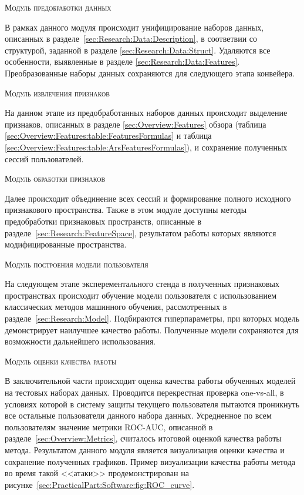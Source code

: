 \documentclass[12pt]{article}
\begin{document}
    \par \textsc{Модуль предобработки данных}
    \par В рамках данного модуля происходит унифицирование наборов данных, описанных в разделе~\ref{sec:Research:Data:Description}, в соответвии со структурой, заданной в разделе \ref{sec:Research:Data:Struct}. Удаляются все особенности, выявленные в разделе \ref{sec:Research:Data:Features}. Преобразованные наборы данных сохраняются для следующего этапа конвейера. \\

    \par \textsc{Модуль извлечения признаков}
    \par На данном этапе из предобработанных наборов данных происходит выделение признаков, описанных в разделе \ref{sec:Overview:Features} обзора (таблица \ref{sec:Overview:Features:table:FeaturesFormulas} и таблица \ref{sec:Overview:Features:table:ArsFeaturesFormulas}), и сохранение полученных сессий пользователей. \\

    \par \textsc{Модуль обработки признаков}
    \par Далее происходит объединение всех сессий и формирование полного исходного признакового пространства. Также в этом модуле доступны методы предобработки признаковых пространств, описанные в разделе~\ref{sec:Research:FeatureSpace}, результатом работы которых являются модифицированные пространства. \\

    \par \textsc{Модуль построения модели пользователя}
    \par На следующем этапе эксперементального стенда в полученных признаковых пространствах происходит обучение модели пользователя с использованием классических методов машинного обучения, рассмотренных в разделе~\ref{sec:Research:Model}. Подбираются гиперпараметры, при которых модель демонстрирует наилучшее качество работы. Полученные модели сохраняются для возможности дальнейшего использования. \\

    \par \textsc{Модуль оценки качества работы}
    \par В заключительной части происходит оценка качества работы обученных моделей на тестовых наборах данных. Проводится перекрестная проверка one-vs-all, в условиях которой в систему защиты текущего пользователя пытаются проникнуть все остальные пользователи данного набора данных. Усредненное по всем пользователям значение метрики ROC-AUC, описанной в разделе~\ref{sec:Overview:Metrics}, считалось итоговой оценкой качества работы метода. Результатом данного модуля является визуализация оценки качества и сохранение полученных графиков. Пример визуализации качества работы метода во время такой <<атаки>> продемонстрирован на рисунке~\ref{sec:PracticalPart:Software:fig:ROC_curve}. \\
\end{document}
